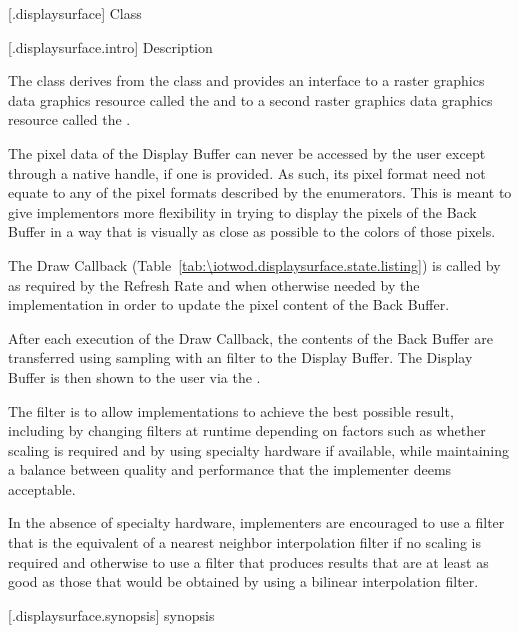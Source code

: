  [\iotwod.displaysurface] {Class }

 [\iotwod.displaysurface.intro] { Description}

\pnum
{}%
The class  derives from the  class and provides an interface to a raster graphics data graphics resource called the  and to a second raster graphics data graphics resource called the .

\pnum
The pixel data of the Display Buffer can never be accessed by the user except through a native handle, if one is provided. As such, its pixel format need not equate to any of the pixel formats described by the  enumerators. This is meant to give implementors more flexibility in trying to display the pixels of the Back Buffer in a way that is visually as close as possible to the colors of those pixels.

\pnum
The Draw Callback (Table~\ref{tab:\iotwod.displaysurface.state.listing}) is called by  as required by the Refresh Rate and when otherwise needed by the implementation in order to update the pixel content of the Back Buffer.

\pnum
After each execution of the Draw Callback, the contents of the Back Buffer are transferred using sampling with an \unspecnorm filter to the Display Buffer. The Display Buffer is then shown to the user via the .
\begin{note}
The filter is \unspecnorm to allow implementations to achieve the best possible result, including by changing filters at runtime depending on factors such as whether scaling is required and by using specialty hardware if available, while maintaining a balance between quality and performance that the implementer deems acceptable.

In the absence of specialty hardware, implementers are encouraged to use a filter that is the equivalent of a nearest neighbor interpolation filter if no scaling is required and otherwise to use a filter that produces results that are at least as good as those that would be obtained by using a bilinear interpolation filter.
\end{note}

 [\iotwod.displaysurface.synopsis] { synopsis}

